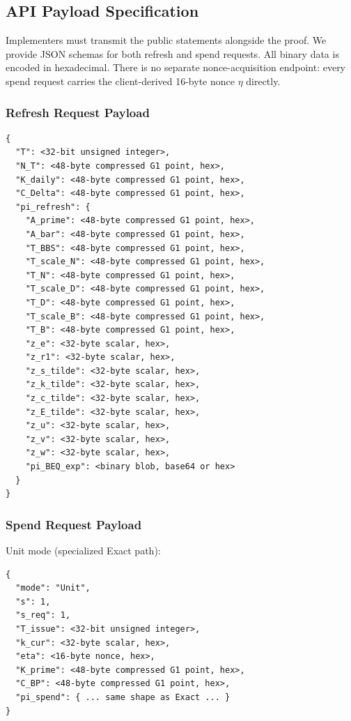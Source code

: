 \documentclass[11pt]{article}
\theoremstyle{definitionstyle}
\theoremstyle{plain}
\begin{document}
\subsection{API Payload Specification}

Implementers must transmit the public statements alongside the proof. We provide JSON schemas for both refresh and spend requests. All binary data is encoded in hexadecimal. There is no separate nonce-acquisition endpoint: every spend request carries the client-derived 16-byte nonce $\eta$ directly.

\subsubsection{Refresh Request Payload}
\begin{verbatim}
{
  "T": <32-bit unsigned integer>,
  "N_T": <48-byte compressed G1 point, hex>,
  "K_daily": <48-byte compressed G1 point, hex>,
  "C_Delta": <48-byte compressed G1 point, hex>,
  "pi_refresh": {
    "A_prime": <48-byte compressed G1 point, hex>,
    "A_bar": <48-byte compressed G1 point, hex>,
    "T_BBS": <48-byte compressed G1 point, hex>,
    "T_scale_N": <48-byte compressed G1 point, hex>,
    "T_N": <48-byte compressed G1 point, hex>,
    "T_scale_D": <48-byte compressed G1 point, hex>,
    "T_D": <48-byte compressed G1 point, hex>,
    "T_scale_B": <48-byte compressed G1 point, hex>,
    "T_B": <48-byte compressed G1 point, hex>,
    "z_e": <32-byte scalar, hex>,
    "z_r1": <32-byte scalar, hex>,
    "z_s_tilde": <32-byte scalar, hex>,
    "z_k_tilde": <32-byte scalar, hex>,
    "z_c_tilde": <32-byte scalar, hex>,
    "z_E_tilde": <32-byte scalar, hex>,
    "z_u": <32-byte scalar, hex>,
    "z_v": <32-byte scalar, hex>,
    "z_w": <32-byte scalar, hex>,
    "pi_BEQ_exp": <binary blob, base64 or hex>
  }
}
\end{verbatim}

\subsubsection{Spend Request Payload}
Unit mode (specialized Exact path):
\begin{verbatim}
{
  "mode": "Unit",
  "s": 1,
  "s_req": 1,
  "T_issue": <32-bit unsigned integer>,
  "k_cur": <32-byte scalar, hex>,
  "eta": <16-byte nonce, hex>,
  "K_prime": <48-byte compressed G1 point, hex>,
  "C_BP": <48-byte compressed G1 point, hex>,
  "pi_spend": { ... same shape as Exact ... }
}
\end{verbatim}
\end{document}
